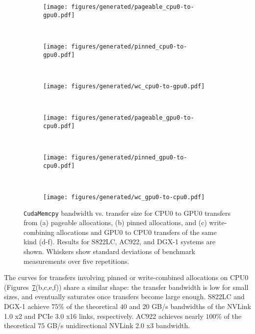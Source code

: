 \begin{figure}[H]
	\centering
	\begin{subfigure}[b]{0.3\textwidth}
		\texttt{[image: figures/generated/pageable\_cpu0-to-gpu0.pdf]}
		\caption{}
		\label{fig:pageable-cpu0-gpu0}
	\end{subfigure}
	~
	\begin{subfigure}[b]{0.3\textwidth}
		\texttt{[image: figures/generated/pinned\_cpu0-to-gpu0.pdf]}
		\caption{}
		\label{fig:pinned-cpu0-gpu0}
	\end{subfigure}
	~
	\begin{subfigure}[b]{0.3\textwidth}
		\texttt{[image: figures/generated/wc\_cpu0-to-gpu0.pdf]}
		\caption{}
		\label{fig:wc-cpu0-gpu0}
	\end{subfigure}
	\\
	\begin{subfigure}[b]{0.3\textwidth}
		\texttt{[image: figures/generated/pageable\_gpu0-to-cpu0.pdf]}
		\caption{}
		\label{fig:pageable-gpu0-cpu0}
	\end{subfigure}
	~
	\begin{subfigure}[b]{0.3\textwidth}
		\texttt{[image: figures/generated/pinned\_gpu0-to-cpu0.pdf]}
		\caption{}
		\label{fig:pinned-gpu0-cpu0}
	\end{subfigure}
	~
	\begin{subfigure}[b]{0.3\textwidth}
		\texttt{[image: figures/generated/wc\_gpu0-to-cpu0.pdf]}
		\caption{}
		\label{fig:wc-gpu0-cpu0}
	\end{subfigure}
	\caption[\texttt{CudaMemcpy} bandwidth for CPU0-GPU0 transfers]{
		\texttt{CudaMemcpy} bandwidth vs. transfer size for CPU0 to GPU0 transfers from 
		(a) pageable allocations,
		(b) pinned allocations, and
		(c) write-combining allocations and 
		GPU0 to CPU0 transfers of the same kind (d-f).
		Results for S822LC, AC922, and DGX-1 systems are shown.
		Whiskers show standard deviations of benchmark measurements over five repetitions.
	}
	\label{fig:pageable-pinned-wc}
\end{figure}


The curves for transfers involving pinned or write-combined allocations on CPU0 (Figures~\ref{fig:pageable-pinned-wc}(b,c,e,f)) share a similar shape: the transfer bandwidth is low for small sizes, and eventually saturates once transfers become large enough.
S822LC and DGX-1 achieve \mytilde $75$\% of the theoretical $40$ and $20$ GB/s bandwidths of the NVLink 1.0 x2 and PCIe 3.0 x16 links, respectively.
AC922 achieves nearly $100$\% of the theoretical $75$ GB/s unidirectional NVLink 2.0 x3 bandwidth.

